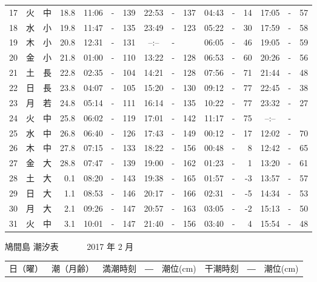 \documentclass[12pt.a4j]{jsarticle}
\begin{document}
\begin{center}
\begin{table}[ht]
\begin{tabular}{|rc|cr|ccrccr|ccrccr|}
17 & 火 & 中 & 18.8 &  11:06 &-& 139  &  22:53 &-& 137  &   04:43 &-&  14  &   17:05 &-&  57  \\
18 & 水 & 小 & 19.8 &  11:47 &-& 135  &  23:49 &-& 123  &   05:22 &-&  30  &   17:59 &-&  58  \\
19 & 木 & 小 & 20.8 &  12:31 &-& 131  &  --:-- &-&     &   06:05 &-&  46  &   19:05 &-&  59  \\
20 & 金 & 小 & 21.8 &  01:00 &-& 110  &  13:22 &-& 128  &   06:53 &-&  60  &   20:26 &-&  56  \\
21 & 土 & 長 & 22.8 &  02:35 &-& 104  &  14:21 &-& 128  &   07:56 &-&  71  &   21:44 &-&  48  \\
22 & 日 & 長 & 23.8 &  04:07 &-& 105  &  15:20 &-& 130  &   09:12 &-&  77  &   22:45 &-&  38  \\
23 & 月 & 若 & 24.8 &  05:14 &-& 111  &  16:14 &-& 135  &   10:22 &-&  77  &   23:32 &-&  27  \\
24 & 火 & 中 & 25.8 &  06:02 &-& 119  &  17:01 &-& 142  &   11:17 &-&  75  &   --:-- &-&     \\
25 & 水 & 中 & 26.8 &  06:40 &-& 126  &  17:43 &-& 149  &   00:12 &-&  17  &   12:02 &-&  70  \\
26 & 木 & 中 & 27.8 &  07:15 &-& 133  &  18:22 &-& 156  &   00:48 &-&   8  &   12:42 &-&  65  \\
27 & 金 & 大 & 28.8 &  07:47 &-& 139  &  19:00 &-& 162  &   01:23 &-&   1  &   13:20 &-&  61  \\
28 & 土 & 大 &  0.1 &  08:20 &-& 143  &  19:38 &-& 165  &   01:57 &-&  -3  &   13:57 &-&  57  \\
29 & 日 & 大 &  1.1 &  08:53 &-& 146  &  20:17 &-& 166  &   02:31 &-&  -5  &   14:34 &-&  53  \\
30 & 月 & 大 &  2.1 &  09:26 &-& 147  &  20:57 &-& 163  &   03:05 &-&  -2  &   15:13 &-&  50  \\
31 & 火 & 中 &  3.1 &  10:01 &-& 147  &  21:40 &-& 156  &   03:40 &-&   4  &   15:54 &-&  48  \\
   \hline
   \end{tabular}
\end{table}
\newpage
 {\LARGE 鳩間島  潮汐表　　　}
 {\large 2017 年  2 月}\\
 \begin{table}[ht]
    \begin{tabular}{|rc|cr|ccrccr|ccrccr|}
    \hline
    \multicolumn{2}{|c|}{日（曜）} & \multicolumn{2}{c|}{潮（月齢）} & \multicolumn{6}{c|}{満潮時刻　―　潮位(cm)} & \multicolumn{6}{c|}{干潮時刻　―　潮位(cm)} \\

\end{tabular}
\end{table}
\end{center}
\end{document}
